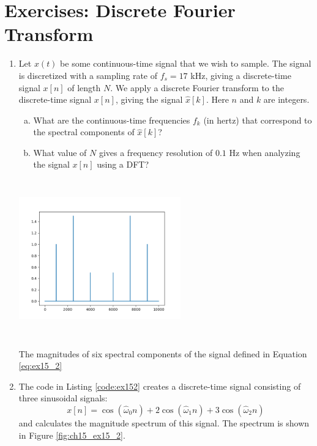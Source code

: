 \newpage
\section{Exercises: Discrete Fourier Transform}

\begin{enumerate}
\item Let $x(t)$ be some continuous-time signal that we wish to sample. The signal is discretized with a sampling rate of $f_{s}=17$ kHz, giving a discrete-time signal $x[n]$ of length $N$. We apply a discrete Fourier transform to the discrete-time signal $x[n]$, giving the signal $\hat{x}[k]$. Here $n$ and $k$ are integers.

\begin{enumerate}[a)]
    \item What are the continuous-time frequencies $f_{k}$ (in hertz) that correspond to the spectral components of $\hat{x}[k]$?
    
    \item What value of $N$ gives a frequency resolution of $0.1$ Hz when analyzing the signal $x[n]$ using a DFT?
\end{enumerate}

\begin{marginfigure}
\includegraphics[width=7.0cm,height=6.8cm]{ch15/figures/ex152.png}
\caption{The magnitudes of six spectral components of the signal defined in Equation \ref{eq:ex15_2}}
\label{fig:ch15_ex15_2}
\end{marginfigure}

\item The code in Listing \ref{code:ex152} creates a discrete-time signal consisting of three sinusoidal signals:
\begin{equation}
x[n]=\cos(\hat{\omega}_0 n)+2\cos(\hat{\omega}_1 n)+3\cos(\hat{\omega}_2 n)
\label{eq:ex15_2}
\end{equation}
and calculates the magnitude spectrum of this signal. The spectrum is shown in Figure \ref{fig:ch15_ex15_2}.


\end{enumerate}
